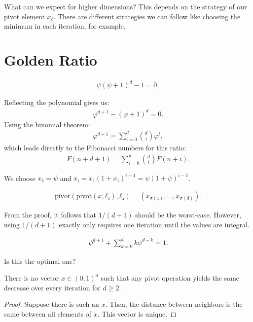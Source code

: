 \documentclass[english,version-2020-11]{uzl-thesis}
\begin{document}
What can we expect for higher dimensions?
This depends on the strategy of our pivot element $x_\ell$.
There are different strategies we can follow like choosing the minimum in each iteration, for example.

\section{Golden Ratio}

\begin{align*}
  ψ(ψ + 1)^d - 1 = 0,
\end{align*}

Reflecting the polynomial gives us:
\begin{align*}
  φ^{d+1} - (φ + 1)^d = 0.
\end{align*}
Using the binomial theorem:
\begin{align*}
  φ^{d+1} = ∑_{i=0}^d \binom{d}{i} φ^i,
\end{align*}
which leads directly to the Fibonacci numbers for this ratio:
\begin{align*}
  F(n + d + 1) = ∑_{i=0}^d \binom{d}{i} F(n + i).
\end{align*}

We choose $x₁ = ψ$ and $x_i = x₁ (1 + x₁)^{i-1} = ψ (1 + ψ)^{i-1}$.

\begin{align*}
  \text{pivot}(\text{pivot}(x, ℓ₁), ℓ₂) = \left(x_{σ(1)}, \dots, x_{σ(d)}\right).
\end{align*}

From the proof, it follows that $1/(d+1)$ should be the worst-case.
However, using $1/(d+1)$ exactly only requires one iteration until the values are integral.

\begin{align*}
  ψ^{d+1} + ∑_{k=0}^d k ψ^{d-k} = 1.
\end{align*}

Is this the optimal one?

\begin{theorem}
  There is no vector $x ∈ (0, 1)^d$
  such that any pivot operation yields the same decrease
  over every iteration for $d ≥ 2$.
\end{theorem}

\begin{proof}
  Suppose there is such an $x$.
  Then, the distance between neighbors is the same between all elements of $x$.
  This vector is unique.
\end{proof}
\end{document}
